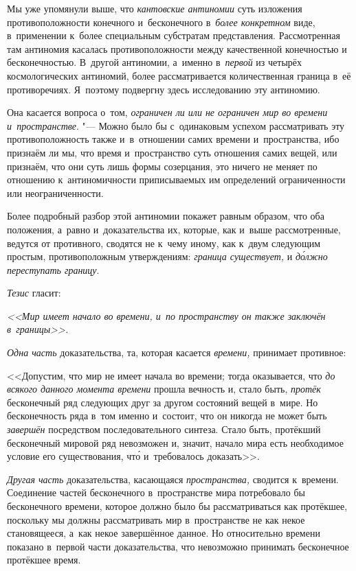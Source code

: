 Мы уже упомянули выше, что {\em кантовские антиномии} суть изложения
противоположности конечного и~бесконечного в~{\em более конкретном} виде,
в~применении к~более специальным субстратам представления. Рассмотренная там
антиномия касалась противоположности между качественной конечностью и
бесконечностью. В~другой антиномии, а~именно в~{\em первой} из четырёх
космологических антиномий, более рассматривается количественная граница в~её
противоречиях. Я~поэтому подвергну здесь исследованию эту антиномию.

Она касается вопроса о~том,
{\em ограничен ли или не ограничен мир во времени и~пространстве}. "--- Можно
было бы с~одинаковым успехом рассматривать эту противоположность также
и~в~отношении самих времени и~пространства, ибо признаём ли мы, что время
и~пространство суть отношения самих вещей, или признаём, что они суть лишь
формы созерцания, это ничего не меняет по отношению к~антиномичности
приписываемых им определений ограниченности или неограниченности.

Более подробный разбор этой антиномии покажет равным образом, что оба
положения, а~равно и~доказательства их, которые, как и~выше рассмотренные,
ведутся от противного, сводятся не к~чему иному, как к~двум следующим простым,
противоположным утверждениям: {\em граница существует,} и
{\em д\'{о}лжно переступать границу}.

{\em Тезис} гласит:

{\em <<Мир имеет начало во времени, и~по пространству он
также заключён в~границы>>.}

{\em Одна часть} доказательства, та, которая касается
{\em времени,} принимает противное:

<<Допустим, что мир не имеет начала во времени; тогда оказывается, что
{\em до всякого данного момента времени} прошла вечность и, стало быть,
{\em протёк} бесконечный ряд следующих друг за другом состояний вещей в~мире.
Но бесконечность ряда в~том именно и~состоит, что он никогда не может быть
{\em завершён} посредством последовательного синтеза. Стало быть, протёкший
бесконечный мировой ряд невозможен и, значит, начало мира есть необходимое
условие его существования, чт\'{о} и~требовалось доказать>>.

{\em Другая часть} доказательства, касающаяся {\em пространства,} сводится
к~времени. Соединение частей бесконечного в~пространстве мира потребовало бы
бесконечного времени, которое должно было бы рассматриваться как протёкшее,
поскольку мы должны рассматривать мир в~пространстве не как некое становящееся,
а~как некое завершённое данное. Но относительно времени показано в~первой части
доказательства, что невозможно принимать бесконечное протёкшее время.

